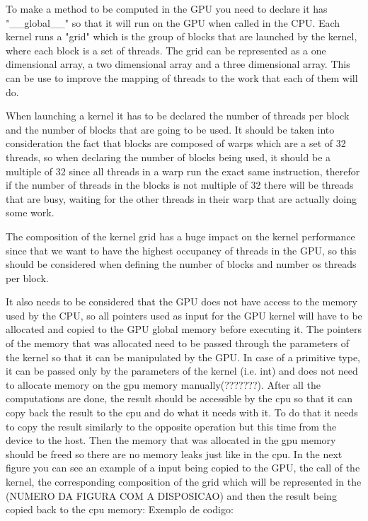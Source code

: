 \documentclass[runningheads]{llncs}
\begin{document}
To make a method to be computed in the GPU you need to declare it has "\_\_global\_\_" so that it will run on the GPU when called in the CPU. Each kernel runs a "grid" which is the group of blocks that are launched by the kernel, where each block is a set of threads. The grid can be represented as a one dimensional array, a two dimensional array and a three dimensional array. This can be use to improve the mapping of threads to the work that each of them will do. 

When launching a kernel it has to be declared the number of threads per block and the number of blocks that are going to be used. It should be taken into consideration the fact that blocks are composed of warps which are a set of 32 threads, so when declaring the number of blocks being used, it should be a multiple of 32 since all threads in a warp run the exact same instruction, therefor if the number of threads in the blocks is not multiple of 32 there will be threads that are busy, waiting for the other threads in their warp that are actually doing some work.

The composition of the kernel grid has a huge impact on the kernel performance since that we want to have the highest occupancy of threads in the GPU, so this should be considered when defining the number of blocks and number os threads per block.

It also needs to be considered that the GPU does not have access to the memory used by the CPU, so all pointers used as input for the GPU kernel will have to be allocated and copied to the GPU global memory before executing it. The pointers of the memory that was allocated need to be passed through the parameters of the kernel so that it can be manipulated by the GPU. In case of a primitive type, it can be passed only by the parameters of the kernel (i.e. int) and does not need to allocate memory on the gpu memory manually(???????). After all the computations are done, the result should be accessible by the cpu so that it can copy back the result to the cpu and do what it needs with it. To do that it needs to copy the result similarly to the opposite operation but this time from the device to the host. Then the memory that was allocated in the gpu memory should be freed so there are no memory leaks just like in the cpu. In the next figure you can see an example of a input being copied to the GPU, the call of the kernel, the corresponding composition of the grid which will be represented in the (NUMERO DA FIGURA COM A DISPOSICAO) and then the result being copied back to the cpu memory:
\newline
Exemplo de codigo: 
\newline
\end{document}
